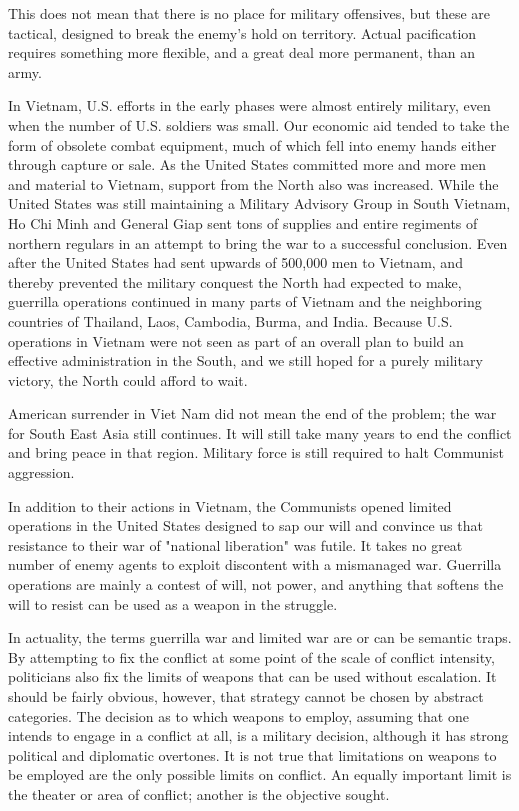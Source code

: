 This does not mean that there is no place for military offensives, but these are tactical, designed to break the enemy's hold on territory. Actual pacification requires something more flexible, and a great deal more permanent, than an army.

In Vietnam, U.S. efforts in the early phases were almost entirely military, even when the number of U.S. soldiers was small. Our economic aid tended to take the form of obsolete combat equipment, much of which fell into enemy hands either through capture or sale. As the United States committed more and more men and material to Vietnam, support from the North also was increased. While the United States was still maintaining a Military Advisory Group in South Vietnam, Ho Chi Minh and General Giap sent tons of supplies and entire regiments of northern regulars in an attempt to bring the war to a successful conclusion. Even after the United States had sent upwards of 500,000 men to Vietnam, and thereby prevented the military conquest the North had expected to make, guerrilla operations continued in many parts of Vietnam and the neighboring countries of Thailand, Laos, Cambodia, Burma, and India. Because U.S. operations in Vietnam were not seen as part of an overall plan to build an effective administration in the South, and we still hoped for a purely military victory, the North could afford to wait.

American surrender in Viet Nam did not mean the end of the problem; the war for South East Asia still continues. It will still take many years to end the conflict and bring peace in that region. Military force is still required to halt Communist aggression.

In addition to their actions in Vietnam, the Communists opened limited operations in the United States designed to sap our will and convince us that resistance to their war of "national liberation" was futile. It takes no great number of enemy agents to exploit discontent with a mismanaged war. Guerrilla operations are mainly a contest of will, not power, and anything that softens the will to resist can be used as a weapon in the struggle.

In actuality, the terms guerrilla war and limited war are or can be semantic traps. By attempting to fix the conflict at some point of the scale of conflict intensity, politicians also fix the limits of weapons that can be used without escalation. It should be fairly obvious, however, that strategy cannot be chosen by abstract categories. The decision as to which weapons to employ, assuming that one intends to engage in a conflict at all, is a military decision, although it has strong political and diplomatic overtones. It is not true that limitations on weapons to be employed are the only possible limits on conflict. An equally important limit is the theater or area of conflict; another is the objective sought.

